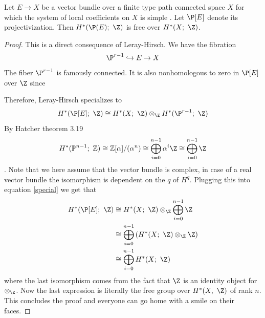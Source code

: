 \begin{theorem}
    Let $E\to X$ be a vector bundle over a finite type path connected space $X$ for which the system of local coefficients on $X$ is simple . Let   $\P[E]$ denote its projectivization. Then $H^*(\P(E);\ \Z)$ is free over $H^*(X;\ \Z)$.
\end{theorem}
\begin{proof}
    This is a direct consequence of Leray-Hirsch. We have the fibration
    \begin{equation*}
        \P^{r-1} \hookrightarrow E \to X
    \end{equation*}
   The fiber $\P^{r-1}$ is famously connected. It is also nonhomologous to zero in $\P[E]$  over $\Z$ since 

   Therefore, Leray-Hirsch specializes to
   \begin{equation}\label{special}
       H^*(\P[E];\ \Z) \cong  H^*(X;\ \Z)\otimes_\Z H^*(\P^{r-1};\ \Z)
   \end{equation}
  By Hatcher \cite{Hatcher} theorem 3.19  
  \begin{equation*}
      H^*(\mathbb{P}^{n-1};\ \mathbb{Z}) \cong \mathbb{Z}[\alpha]/(\alpha^{n})\cong \bigoplus_{i=0}^{n-1}\alpha^i \Z \cong \bigoplus_{i=0}^{n-1} \Z
  \end{equation*}. Note that we here assume that the vector bundle is complex, in case of a real vector bundle the isomorphism is dependent on the $q$ of $H^q$.
  Plugging this into equation \eqref{special} we get that 
  \begin{align*}
       H^*(\P[E];\ \Z) &\cong  H^*(X;\ \Z)\otimes_\Z \bigoplus_{i=0}^{n-1} \Z \\
       & \cong \bigoplus_{i=0}^{n-1}\left( H^*(X;\ \Z)\otimes_\Z  \Z\right)\\
       & \cong \bigoplus_{i=0}^{n-1} H^*(X;\ \Z)
  \end{align*}
  where the last isomorphism comes from the fact that $\Z$ is an identity object for $\otimes_\Z$. Now the last expression is literally the free group over $H^*(X, \ \Z)$ of rank $n$. This concludes the proof and everyone can go home with a smile on their faces.

    
   
\end{proof}


